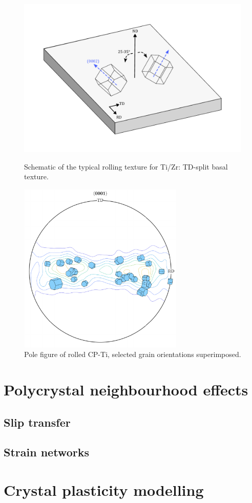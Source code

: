 \begin{figure}[h]
\centering
  \includegraphics[width=\textwidth]{Figures/split_basal.pdf}
  \caption{Schematic of the typical rolling texture for Ti/Zr: TD-split basal texture.\label{fig.splitBasal}}
  \vspace{\baselineskip}
  \includegraphics[width=0.7\textwidth]{Figures/pf_unitcells.pdf}
  \caption{Pole figure of rolled CP-Ti, selected grain orientations superimposed. \label{fig.pfunitcells}}
\end{figure}


\section{Polycrystal neighbourhood effects}
\subsection{Slip transfer}
\subsection{Strain networks}

\section{Crystal plasticity modelling}